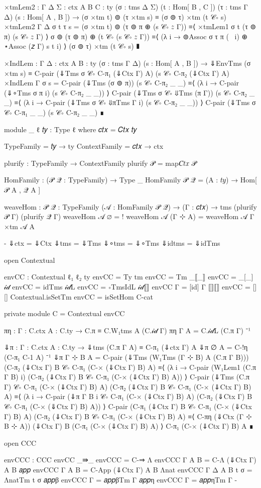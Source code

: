 \begin{code}[hide]
  ×tmLem2 : {Γ Δ Σ : ctx} {A B C : ty} (σ : tms Δ Σ) (t : Hom[ B , C ])
    (τ : tms Γ Δ) (s : Hom[ A , B ]) →
    (σ ×tm t) ⊚ (τ ×tm s) ≡ (σ ⊚ τ) ×tm (t 𝒞∘ s)
  ×tmLem2 {Γ} {Δ} σ t τ s =
    (σ ×tm t) ⊚ (τ ⊚ π ⊕ (s 𝒞∘ 𝑧 {Γ}))
      ≡⟨ ×tmLem1 σ t (τ ⊚ π) (s 𝒞∘ 𝑧 {Γ}) ⟩
    σ ⊚ (τ ⊚ π) ⊕ (t 𝒞∘ (s 𝒞∘ 𝑧 {Γ}))
      ≡⟨ (λ i → ⊚Assoc σ τ π (~ i) ⊕ ⋆Assoc (𝑧 {Γ}) s t i) ⟩
    (σ ⊚ τ) ×tm (t 𝒞∘ s)
      ∎

  ×IndLem : {Γ Δ : ctx} {A B : ty} (σ : tms Γ Δ) (s : Hom[ A , B ]) →
    ⇓EnvTms (σ ×tm s) ≡ C-pair (⇓Tms σ 𝒞∘ C-π₁ (⇓Ctx Γ) A) (s 𝒞∘ C-π₂ (⇓Ctx Γ) A)
  ×IndLem {Γ} σ s =
    C-pair (⇓Tms (σ ⊚ π)) (s 𝒞∘ C-π₂ _ _)
      ≡⟨ (λ i → C-pair (⇓∘Tms σ π i) (s 𝒞∘ C-π₂ _ _)) ⟩
    C-pair (⇓Tms σ 𝒞∘ ⇓Tms (π {Γ})) (s 𝒞∘ C-π₂ _ _)
      ≡⟨ (λ i → C-pair (⇓Tms σ 𝒞∘ ⇓πTms {Γ} i) (s 𝒞∘ C-π₂ _ _)) ⟩
    C-pair (⇓Tms σ 𝒞∘ C-π₁ _ _) (s 𝒞∘ C-π₂ _ _)
      ∎

  module _ {ℓ} {𝑡𝑦 : Type ℓ} where
    𝑐𝑡𝑥 = 𝐶𝑡𝑥 𝑡𝑦

    TypeFamily = 𝑡𝑦 → ty
    ContextFamily = 𝑐𝑡𝑥 → ctx

    plurify : TypeFamily → ContextFamily
    plurify 𝒫 = map𝐶𝑡𝑥 𝒫

    HomFamily : (𝒫 𝒬 : TypeFamily) → Type _
    HomFamily 𝒫 𝒬 = (A : 𝑡𝑦) → Hom[ 𝒫 A , 𝒬 A ]

    weaveHom : {𝒫 𝒬 : TypeFamily} (𝒜 : HomFamily 𝒫 𝒬) →
      (Γ : 𝑐𝑡𝑥) → tms (plurify 𝒫 Γ) (plurify 𝒬 Γ)
    weaveHom 𝒜 ∅ = !
    weaveHom 𝒜 (Γ ⊹ A) = weaveHom 𝒜 Γ ×tm 𝒜 A


{-
  ⇓ctx = ⇓Ctx
  ⇓tms = ⇓Tms
  ⇓∘tms = ⇓∘Tms
  ⇓idtms = ⇓idTms

  open Contextual

  envCC : Contextual ℓ₁ ℓ₂
  ty envCC = Ty
  tm envCC = Tm
  _⟦_⟧ envCC = _[_]
  𝒾𝒹 envCC = idTms
  𝒾𝒹L envCC = ∘TmsIdL
  𝒾𝒹⟦⟧ envCC {Γ} = [id] {Γ}
  ⟦⟧⟦⟧ envCC = [][]
  Contextual.isSetTm envCC = isSetHom C-cat

  private
    module C = Contextual envCC

  πη : {Γ : C.ctx} {A : C.ty} →
    C.π ≡ C.W₁tms A (C.𝒾𝒹 Γ)
  πη {Γ} {A} = C.𝒾𝒹L (C.π {Γ}) ⁻¹

  ⇓π : {Γ : C.ctx} {A : C.ty} →
    ⇓tms (C.π {Γ} {A}) ≡ C-π₁ (⇓ctx Γ) A
  ⇓π {∅} {A} = C-!η (C-π₁ C-1 A) ⁻¹
  ⇓π {Γ ⊹ B} {A} =
    C-pair
      (⇓Tms (W₁Tms (Γ ⊹ B) A (C.π {Γ} {B})))
      (C-π₂ (⇓Ctx Γ) B 𝒞∘ C-π₁ (C-× (⇓Ctx Γ) B) A)
      ≡⟨ (λ i → C-pair
        (W₁Lem1 (C.π {Γ} {B}) i)
        (C-π₂ (⇓Ctx Γ) B 𝒞∘ C-π₁ (C-× (⇓Ctx Γ) B) A)) ⟩
    C-pair
      (⇓Tms (C.π {Γ}) 𝒞∘ C-π₁ (C-× (⇓Ctx Γ) B) A)
      (C-π₂ (⇓Ctx Γ) B 𝒞∘ C-π₁ (C-× (⇓Ctx Γ) B) A)
      ≡⟨ (λ i → C-pair
        (⇓π {Γ} {B} i 𝒞∘ C-π₁ (C-× (⇓Ctx Γ) B) A)
        (C-π₂ (⇓Ctx Γ) B 𝒞∘ C-π₁ (C-× (⇓Ctx Γ) B) A)) ⟩
    C-pair
      (C-π₁ (⇓Ctx Γ) B 𝒞∘ C-π₁ (C-× (⇓Ctx Γ) B) A)
      (C-π₂ (⇓Ctx Γ) B 𝒞∘ C-π₁ (C-× (⇓Ctx Γ) B) A)
      ≡⟨ C-πη (⇓Ctx (Γ ⊹ B ⊹ A)) (⇓Ctx Γ) B (C-π₁ (C-× (⇓Ctx Γ) B) A) ⟩
    C-π₁ (C-× (⇓Ctx Γ) B) A
      ∎

  open CCC

  envCCC : CCC envCC
  _⇛_ envCCC = C-⇒
  Λ envCCC {Γ} {A} {B} = C-Λ (⇓Ctx Γ) A B
  𝑎𝑝𝑝 envCCC {Γ} {A} {B} = C-App (⇓Ctx Γ) A B
  Λnat envCCC {Γ} {Δ} {A} {B} t σ = ΛnatTm t σ
  𝑎𝑝𝑝β envCCC {Γ} = 𝑎𝑝𝑝βTm {Γ}
  𝑎𝑝𝑝η envCCC {Γ} = 𝑎𝑝𝑝ηTm {Γ}
-}

\end{code}
